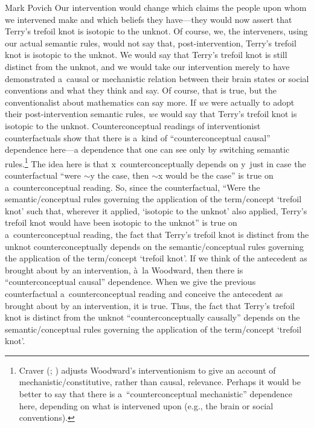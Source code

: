 \begin{artengenv}{Mark Povich}
Our intervention would change which claims the people upon whom we intervened make and which beliefs they have---they would now assert that Terry's trefoil knot is isotopic to the unknot. Of course, we, the interveners, using our actual semantic rules, would not say that, post-intervention, Terry's trefoil knot is isotopic to the unknot. We would say that Terry's trefoil knot is still distinct from the unknot, and we would take our intervention merely to have demonstrated a~causal or mechanistic relation between their brain states or social conventions and what they think and say. Of course, that is true, but the conventionalist about mathematics can say more. If \textit{we} were actually to adopt their post-intervention semantic rules, \textit{we} would say that Terry's trefoil knot is isotopic to the unknot. Counterconceptual readings of interventionist counterfactuals show that there is a~kind of ``counterconceptual causal'' dependence here---a dependence that one can see only by switching semantic rules.\footnote{Craver
(\cite*[][]{Craver2007}; \cite[][]{craver_constitutive_2021}) %
 adjusts Woodward's interventionism to give an account of mechanistic/constitutive, rather than causal, relevance. Perhaps it would be better to say that there is a~``counterconceptual mechanistic'' dependence here, depending on what is intervened upon (e.g., the brain or social conventions).} The idea here is that x~counterconceptually depends on y~just in case the counterfactual ``were ${\sim}$y the case, then ${\sim}$x would be the case'' is true on a~counterconceptual reading. So, since the counterfactual, ``Were the semantic/conceptual rules governing the application of the term/concept ‘trefoil knot' such that, wherever it applied, ‘isotopic to the unknot' also applied, Terry's trefoil knot would have been isotopic to the unknot'' is true on a~counterconceptual reading, the fact that Terry's trefoil knot is distinct from the unknot counterconceptually depends on the semantic/conceptual rules governing the application of the term/concept ‘trefoil knot'. If we think of the antecedent as brought about by an intervention, à~la Woodward, then there is ``counterconceptual causal'' dependence. When we give the previous counterfactual a~counterconceptual reading and conceive the antecedent as brought about by an intervention, it is true. Thus, the fact that Terry's trefoil knot is distinct from the unknot ``counterconceptually causally'' depends on the semantic/conceptual rules governing the application of the term/concept ‘trefoil knot'.


\end{artengenv}
